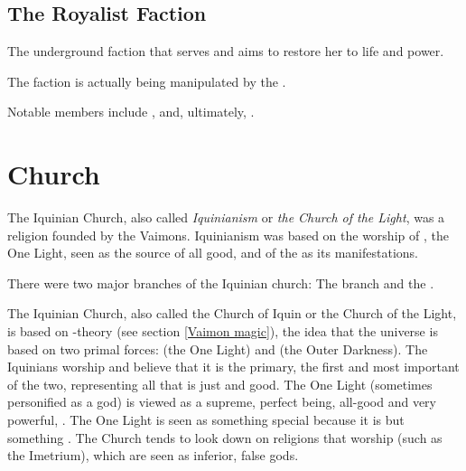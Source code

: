 \subsection{The Royalist Faction}
The underground faction that serves  and aims to restore her to life and power. 

The faction is actually being manipulated by the . 

Notable members include ,  and, ultimately, . 















\section{\Iquinian Church}
The Iquinian Church, also called \emph{Iquinianism} or \emph{the Church of the Light}, was a religion founded by the Vaimons. 
Iquinianism was based on the worship of \iquin{}, the One Light, seen as the source of all good, and of the \Sephiroth{} as its manifestations. 

There were two major branches of the Iquinian church: 
The  branch and the . 

The Iquinian Church, also called the {Church of Iquin} or the {Church of the Light}, is based on \Iquin-\Nieur theory (see section \ref{Vaimon magic}), the idea that the universe is based on two primal forces: 
\Iquin (the One Light) and \Nieur (the Outer Darkness). 
The Iquinians worship \Iquin and believe that it is the primary, the first and most important of the two, representing all that is just and good. 
The One Light (sometimes personified as a god) is viewed as a supreme, perfect being, all-good and very powerful, . 
The One Light is seen as something special because it is  but something . 
The Church tends to look down on religions that worship  (such as the Imetrium), which are seen as inferior, false gods. 

